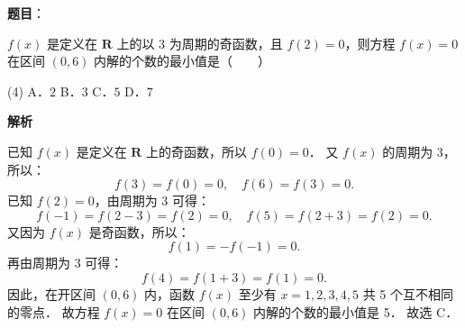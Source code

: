 \begin{answer}

\textbf{题目}：

$f(x)$ 是定义在 $\mathbf{R}$ 上的以 3 为周期的奇函数，且 $f(2) = 0$，则方程 $f(x) = 0$ 在区间 $(0, 6)$ 内解的个数的最小值是\mbox{（　　）}

\begin{gkopts}(4)
\task A．$2$
\task B．$3$
\task C．$5$
\task D．$7$
\end{gkopts}

\textbf{解析}

已知 $f(x)$ 是定义在 $\mathbf{R}$ 上的奇函数，所以 $f(0) = 0$．
又 $f(x)$ 的周期为 3，所以：
\nopagebreak[4]
\[
f(3) = f(0) = 0, \quad f(6) = f(3) = 0.
\]
已知 $f(2) = 0$，由周期为 3 可得：
\nopagebreak[4]
\[
f(-1) = f(2 - 3) = f(2) = 0, \quad f(5) = f(2 + 3) = f(2) = 0.
\]
又因为 $f(x)$ 是奇函数，所以：
\nopagebreak[4]
\[
f(1) = -f(-1) = 0.
\]
再由周期为 3 可得：
\nopagebreak[4]
\[
f(4) = f(1 + 3) = f(1) = 0.
\]
因此，在开区间 $(0, 6)$ 内，函数 $f(x)$ 至少有 $x = 1, 2, 3, 4, 5$ 共 5 个互不相同的零点．
故方程 $f(x) = 0$ 在区间 $(0, 6)$ 内解的个数的最小值是 5．
故选 C．


\end{answer}

